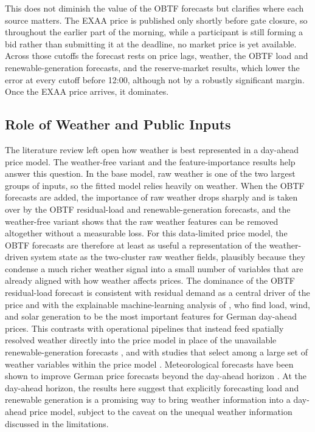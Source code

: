 This does not diminish the value of the OBTF forecasts but clarifies
where each source matters. The EXAA price is published only shortly before gate
closure, so throughout the earlier part of the morning, while a participant is
still forming a bid rather than submitting it at the deadline, no market price is
yet available. Across those cutoffs the forecast rests on price lags, weather, the OBTF load and renewable-generation forecasts, and the reserve-market results,
which lower the error at every cutoff before 12:00, although not by a robustly
significant margin. Once the EXAA price arrives, it dominates.

\subsection{Role of Weather and Public Inputs}

The literature review left open how weather is best represented in a day-ahead
price model. The weather-free variant and the feature-importance results help
answer this question. In the base model,
raw weather is one of the two largest groups of inputs, so the fitted model
relies heavily on weather. When the OBTF
forecasts are added, the importance of raw weather drops sharply and is taken over by the OBTF residual-load and renewable-generation forecasts, and the
weather-free variant shows that the raw weather features can be removed
altogether without a measurable loss. For this data-limited price model, the
OBTF forecasts are therefore at least as useful a representation of
the weather-driven system state as the two-cluster raw weather fields, plausibly
because they condense a much richer weather signal into a small number of
variables that are already aligned with how weather affects prices. The dominance of the OBTF residual-load forecast is consistent with residual demand as a
central driver of the price \cite{do2021residualDemand,pape2016fundamentals} and
with the explainable machine-learning analysis of \textcite{trebbien2023merit},
who find load, wind, and solar generation to be the most important features for
German day-ahead prices. This
contrasts with operational pipelines that instead feed spatially resolved
weather directly into the price model in place of the unavailable renewable-generation forecasts \cite{eiser2026operational}, and with studies that select among a large
set of weather variables within the price model \cite{ludwig2015bigdata}. Meteorological
forecasts have been shown to improve German price forecasts beyond the day-ahead
horizon \cite{sgarlato2023weatherPredictions}. At the day-ahead horizon, the
results here suggest that explicitly
forecasting load and renewable generation is a promising way to bring weather
information into a day-ahead price model, subject to the caveat on the unequal
weather information discussed in the limitations.

